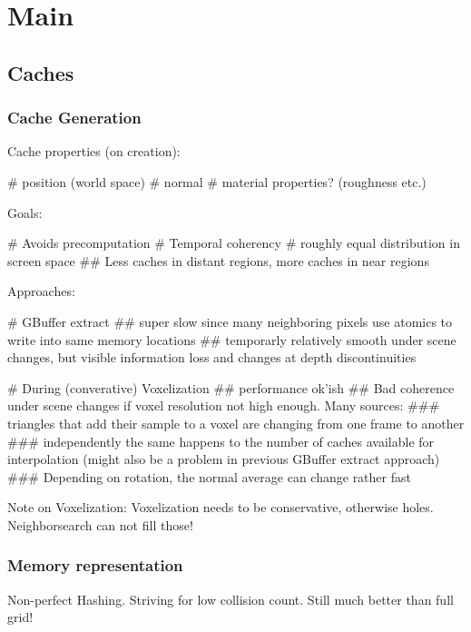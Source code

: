 \documentclass[thesis.tex]{subfiles}
\begin{document}
\chapter{Main}\label{chap:basics}

\section{Caches}
\subsection{Cache Generation}
Cache properties (on creation):
\begin{easylist}[itemize]
# position (world space)
# normal
# material properties? (roughness etc.)
\end{easylist}

Goals:
\begin{easylist}[itemize]
# Avoids precomputation
# Temporal coherency
# roughly equal distribution in screen space
## Less caches in distant regions, more caches in near regions
\end{easylist}
Approaches:
\begin{easylist}[itemize]
# GBuffer extract
## super slow since many neighboring pixels use atomics to write into same memory locations
## temporarly relatively smooth under scene changes, but visible information loss and changes at depth discontinuities

# During (converative) Voxelization
## performance ok'ish
## Bad coherence under scene changes if voxel resolution not high enough. Many sources:
### triangles that add their sample to a voxel are changing from one frame to another
### independently the same happens to the number of caches available for interpolation (might also be a problem in previous GBuffer extract approach)
### Depending on rotation, the normal average can change rather fast

\end{easylist}

Note on Voxelization: Voxelization needs to be conservative, otherwise holes. Neighborsearch can not fill those!

\subsection{Memory representation}
Non-perfect Hashing. Striving for low collision count.
Still much better than full grid!

\subfilebib %
\end{document}
